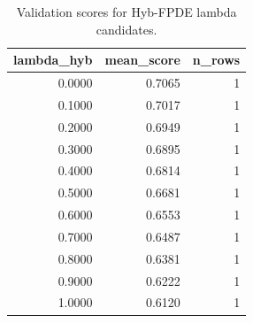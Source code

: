 \begin{table}[t]
\caption{Validation scores for Hyb-FPDE lambda candidates.}
\label{tab:lambda_distribution_computed}
\centering
\begin{tabular}{rrr}
\toprule
lambda\_hyb & mean\_score & n\_rows \\
\midrule
0.0000 & 0.7065 & 1 \\
0.1000 & 0.7017 & 1 \\
0.2000 & 0.6949 & 1 \\
0.3000 & 0.6895 & 1 \\
0.4000 & 0.6814 & 1 \\
0.5000 & 0.6681 & 1 \\
0.6000 & 0.6553 & 1 \\
0.7000 & 0.6487 & 1 \\
0.8000 & 0.6381 & 1 \\
0.9000 & 0.6222 & 1 \\
1.0000 & 0.6120 & 1 \\
\bottomrule
\end{tabular}

\end{table}

